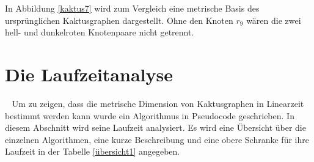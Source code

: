   	 In Abbildung \ref{kaktus7} wird zum Vergleich eine metrische Basis des ursprünglichen Kaktusgraphen dargestellt. Ohne den Knoten $r_9$ wären die zwei hell- und dunkelroten Knotenpaare nicht getrennt.
  	 \clearpage
\section{Die Laufzeitanalyse}
~\linebreak
Um zu zeigen, dass die metrische Dimension von Kaktusgraphen in Linearzeit bestimmt werden kann wurde ein Algorithmus in Pseudocode geschrieben. In diesem Abschnitt wird seine Laufzeit analysiert. Es wird eine Übersicht über die einzelnen Algorithmen, eine kurze Beschreibung und eine obere Schranke für ihre Laufzeit in der Tabelle \ref{übersicht1} angegeben.\newline
\vspace{-1mm}
